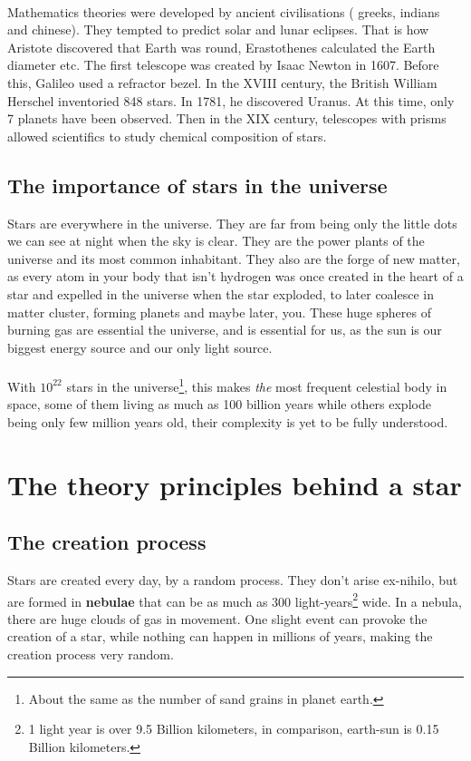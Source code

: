 \documentclass[a4paper, 11pt]{article} %
\begin{document}
\paragraph*{}
Mathematics theories were developed by ancient civilisations ( greeks, indians and chinese). They tempted to predict solar and lunar eclipses. That is how Aristote discovered that Earth was round, Erastothenes calculated the Earth diameter etc.
The first telescope was created by Isaac Newton in 1607. Before this, Galileo used a refractor bezel. In the XVIII century, the British William Herschel inventoried 848 stars. In 1781, he discovered Uranus. At this time, only 7 planets have been observed. Then in the XIX century, telescopes with prisms allowed scientifics to study chemical composition of stars.


\subsection*{The importance of stars in the universe}

Stars are everywhere in the universe. They are far from being only the little dots we can see at night when the sky is clear. They are the power plants of the universe and its most common inhabitant. They also are the forge of new matter, as every atom in your body that isn't hydrogen was once created in the heart of a star and expelled in the universe when the star exploded, to later coalesce in matter cluster, forming planets and maybe later, you.
These huge spheres of burning gas are essential the universe, and is essential for us, as the sun is our biggest energy source and our only light source. 

\paragraph*{}
With $10^{22}$ stars in the universe\footnote{About the same as the number of sand grains in planet earth.}, this makes \textit{the} most frequent celestial body in space, some of them living as much as 100 billion years while others explode being only few million years old, their complexity is yet to be fully understood.



\section{The theory principles behind a star}

\subsection{The creation process}
Stars are created every day, by a random process. They don't arise ex-nihilo, but are formed in \textbf{nebulae} that can be as much as 300 light-years\footnote{ 1 light year is over 9.5 Billion kilometers, in comparison, earth-sun is 0.15 Billion kilometers.} wide. In a nebula, there are huge clouds of gas in movement. One slight event can provoke the creation of a star, while nothing can happen in millions of years, making the creation process very random.
\end{document}
